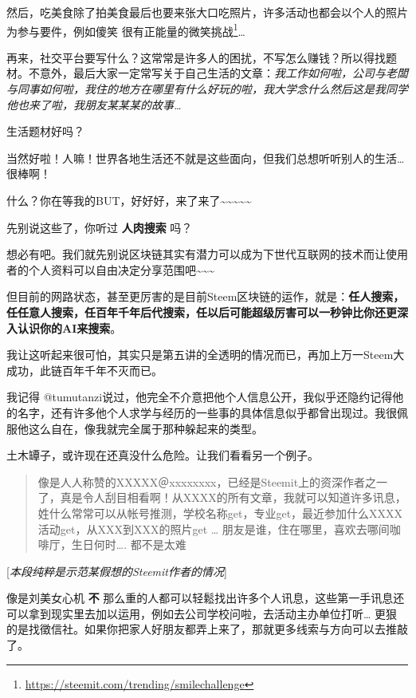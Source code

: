 \documentclass[]{ctexbook}
\renewcommand{\href}[2]{#2\footnote{\url{#1}}}
\begin{document}
然后，吃美食除了拍美食最后也要来张大口吃照片，许多活动也都会以个人的照片为参与要件，例如傻笑 很有正能量的\href{https://steemit.com/trending/smilechallenge}{微笑挑战}\ldots{}

再来，社交平台要写什么？这常常是许多人的困扰，不写怎么赚钱？所以得找题材。不意外，最后大家一定常写关于自己生活的文章：\emph{我工作如何啦，公司与老闆与同事如何啦，我住的地方在哪里有什么好玩的啦，我大学念什么然后这是我同学他也来了啦，我朋友某某某的故事\ldots{}}

生活题材好吗？

当然好啦！人嘛！世界各地生活还不就是这些面向，但我们总想听听别人的生活\ldots{} 很棒啊！

什么？你在等我的BUT，好好好，来了来了\textasciitilde{}\textasciitilde{}\textasciitilde{}\textasciitilde{}\textasciitilde{}

先别说这些了，你听过 \textbf{人肉搜索} 吗？

想必有吧。我们就先别说区块链其实有潜力可以成为下世代互联网的技术而让使用者的个人资料可以自由决定分享范围吧\textasciitilde{}\textasciitilde{}\textasciitilde{}

但目前的网路状态，甚至更厉害的是目前Steem区块链的运作，就是：\textbf{任人搜索，任任意人搜索，任百年千年后代搜索，任以后可能超级厉害可以一秒钟比你还更深入认识你的AI来搜索}。

我让这听起来很可怕，其实只是第五讲的全透明的情况而已，再加上万一Steem大成功，此链百年千年不灭而已。

我记得 @tumutanzi说过，他完全不介意把他个人信息公开，我似乎还隐约记得他的名字，还有许多他个人求学与经历的一些事的具体信息似乎都曾出现过。我很佩服他这么自在，像我就完全属于那种躲起来的类型。

土木罈子，或许现在还真没什么危险。让我们看看另一个例子。

\begin{quote}
像是人人称赞的XXXXX＠xxxxxxxx，已经是Steemit上的资深作者之一了，真是令人刮目相看啊！从XXXX的所有文章，我就可以知道许多讯息，姓什么常常可以从帐号推测，学校名称get，专业get，最近参加什么XXXX活动get，从XXX到XXX的照片get \ldots{} 朋友是谁，住在哪里，喜欢去哪间咖啡厅，生日何时\ldots{}. 都不是太难
\end{quote}

{[}\emph{本段纯粹是示范某假想的Steemit作者的情况}{]}

像是刘美女心机 \textbf{不} 那么重的人都可以轻鬆找出许多个人讯息，这些第一手讯息还可以拿到现实里去加以运用，例如去公司学校问啦，去活动主办单位打听\ldots{} 更狠的是找徵信社。如果你把家人好朋友都弄上来了，那就更多线索与方向可以去推敲了。
\end{document}
